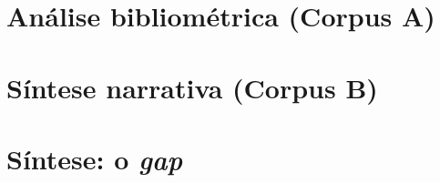 \section{Análise bibliométrica (Corpus A)}
\label{sec:corpus-a}



\section{Síntese narrativa (Corpus B)}
\label{sec:corpus-b}



\section{Síntese: o \emph{gap}}
\label{sec:gap}



